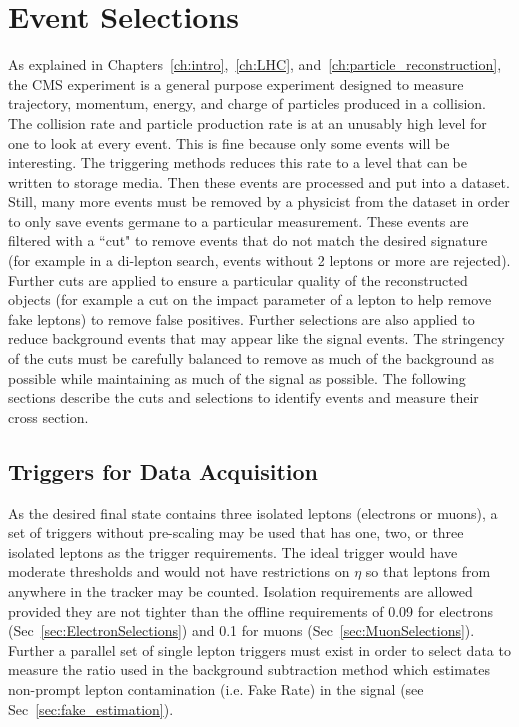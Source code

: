 \chapter{Event Selections}
\label{ch:EventSelections}
As explained in Chapters~\ref{ch:intro},~\ref{ch:LHC}, and~\ref{ch:particle_reconstruction}, the CMS experiment is a general purpose experiment designed to measure trajectory, momentum, energy, and charge of particles produced in a collision. The collision rate and particle production rate is at an unusably high level for one to look at every event. This is fine because only some events will be interesting. The triggering methods reduces this rate to a level that can be written to storage media. Then these events are processed and put into a dataset. Still, many more events must be removed by a physicist from the dataset in order to only save events germane to a particular measurement. These events are filtered with a ``cut" to remove events that do not match the desired signature (for example in a di-lepton search, events without 2 leptons or more are rejected). Further cuts are applied to ensure a particular quality of the reconstructed objects (for example a cut on the impact parameter of a lepton to help remove fake leptons) to remove false positives. Further selections are also applied to reduce background events that may appear like the signal events. The stringency of the cuts must be carefully balanced to remove as much of the background as possible while maintaining as much of the signal as possible. The following sections describe the cuts and selections to identify \ttZ events and measure their cross section.\\

\section{Triggers for Data Acquisition}
\label{sec:Triggers}
As the desired final state contains three isolated leptons (electrons or muons), a set of triggers without pre-scaling may be used that has one, two, or three isolated leptons as the trigger requirements. The ideal trigger would have moderate \pt thresholds and would not have restrictions on $\eta$ so that leptons from anywhere in the tracker may be counted. Isolation requirements are allowed provided they are not tighter than the offline requirements of 0.09 for electrons (Sec~\ref{sec:ElectronSelections}) and 0.1 for muons (Sec~\ref{sec:MuonSelections}). Further a parallel set of single lepton triggers must exist in order to select data to measure the ratio used in the background subtraction method which estimates non-prompt lepton contamination (i.e. Fake Rate) in the signal (see Sec~\ref{sec:fake_estimation}). \\

